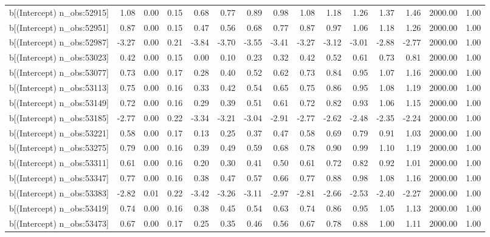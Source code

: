 \begin{table}[ht]
\begin{tabular}{rrrrrrrrrrrrrrr}
  b[(Intercept) n\_obs:52915] & 1.08 & 0.00 & 0.15 & 0.68 & 0.77 & 0.89 & 0.98 & 1.08 & 1.18 & 1.26 & 1.37 & 1.46 & 2000.00 & 1.00 \\ 
  b[(Intercept) n\_obs:52951] & 0.87 & 0.00 & 0.15 & 0.47 & 0.56 & 0.68 & 0.77 & 0.87 & 0.97 & 1.06 & 1.18 & 1.26 & 2000.00 & 1.00 \\ 
  b[(Intercept) n\_obs:52987] & -3.27 & 0.00 & 0.21 & -3.84 & -3.70 & -3.55 & -3.41 & -3.27 & -3.12 & -3.01 & -2.88 & -2.77 & 2000.00 & 1.00 \\ 
  b[(Intercept) n\_obs:53023] & 0.42 & 0.00 & 0.15 & 0.00 & 0.10 & 0.23 & 0.32 & 0.42 & 0.52 & 0.61 & 0.73 & 0.81 & 2000.00 & 1.00 \\ 
  b[(Intercept) n\_obs:53077] & 0.73 & 0.00 & 0.17 & 0.28 & 0.40 & 0.52 & 0.62 & 0.73 & 0.84 & 0.95 & 1.07 & 1.16 & 2000.00 & 1.00 \\ 
  b[(Intercept) n\_obs:53113] & 0.75 & 0.00 & 0.16 & 0.33 & 0.42 & 0.54 & 0.65 & 0.75 & 0.86 & 0.95 & 1.08 & 1.19 & 2000.00 & 1.00 \\ 
  b[(Intercept) n\_obs:53149] & 0.72 & 0.00 & 0.16 & 0.29 & 0.39 & 0.51 & 0.61 & 0.72 & 0.82 & 0.93 & 1.06 & 1.15 & 2000.00 & 1.00 \\ 
  b[(Intercept) n\_obs:53185] & -2.77 & 0.00 & 0.22 & -3.34 & -3.21 & -3.04 & -2.91 & -2.77 & -2.62 & -2.48 & -2.35 & -2.24 & 2000.00 & 1.00 \\ 
  b[(Intercept) n\_obs:53221] & 0.58 & 0.00 & 0.17 & 0.13 & 0.25 & 0.37 & 0.47 & 0.58 & 0.69 & 0.79 & 0.91 & 1.03 & 2000.00 & 1.00 \\ 
  b[(Intercept) n\_obs:53275] & 0.79 & 0.00 & 0.16 & 0.39 & 0.49 & 0.59 & 0.68 & 0.78 & 0.90 & 0.99 & 1.10 & 1.19 & 2000.00 & 1.00 \\ 
  b[(Intercept) n\_obs:53311] & 0.61 & 0.00 & 0.16 & 0.20 & 0.30 & 0.41 & 0.50 & 0.61 & 0.72 & 0.82 & 0.92 & 1.01 & 2000.00 & 1.00 \\ 
  b[(Intercept) n\_obs:53347] & 0.77 & 0.00 & 0.16 & 0.38 & 0.47 & 0.57 & 0.66 & 0.77 & 0.88 & 0.98 & 1.08 & 1.16 & 2000.00 & 1.00 \\ 
  b[(Intercept) n\_obs:53383] & -2.82 & 0.01 & 0.22 & -3.42 & -3.26 & -3.11 & -2.97 & -2.81 & -2.66 & -2.53 & -2.40 & -2.27 & 2000.00 & 1.00 \\ 
  b[(Intercept) n\_obs:53419] & 0.74 & 0.00 & 0.16 & 0.38 & 0.45 & 0.54 & 0.63 & 0.74 & 0.86 & 0.95 & 1.05 & 1.13 & 2000.00 & 1.00 \\ 
  b[(Intercept) n\_obs:53473] & 0.67 & 0.00 & 0.17 & 0.25 & 0.35 & 0.46 & 0.56 & 0.67 & 0.78 & 0.88 & 1.00 & 1.11 & 2000.00 & 1.00 \\ 

\end{tabular}
\end{table}
